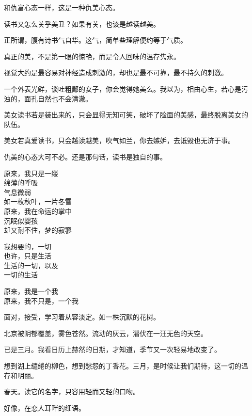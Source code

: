 		和仇富心态一样，这是一种仇美心态。\par
		读书又怎么关乎美丑？如果有关，也该是越读越美。\par
		正所谓，腹有诗书气自华。这气，简单些理解便约等于气质。\par
		真正的美，不是第一眼的惊艳，而是令人回味的温存隽永。\par
		视觉大约是最容易对神经造成刺激的，却也是最不可靠，最不持久的刺激。\par
		一个外表光鲜，谈吐粗鄙的女子，你会觉得她美么。我以为，相由心生，若心是污浊的，面孔自然也不会清澈。\par
		美女读书若是装出来的，只会显得无知可笑，破坏了脸面的美感，最终脱离美女的队伍。\par
		美女若真爱读书，只会越读越美，吹气如兰，你去嫉妒，去诋毁也无济于事。\par
		仇美的心态大可不必。还是那句话，读书是独自的事。

	\endwriting



		\longpoem{}{}{}
			原来，我只是一缕 \\
			绵薄的呼吸 \\
			气息微弱 \\
			如一枚秋叶，一片冬雪 \\
			原来，我在命运的掌中 \\
			沉眠似婴孩 \\
			却又耐不住，梦的寂寥

			我想要的，一切 \\
			也许，只是生活 \\
			生活的一切，以及 \\
			一切的生活

			原来，我是一个我 \\
			原来，我不只是，一个我
		\endlongpoem

	\endwriting



		面对，接受，学习着从容淡定。如一株沉默的花树。

		\vspace{1em}
		北京被阴郁覆盖，雾色苍然。流动的灰云，潜伏在一汪无色的天空。\par
		已是三月。我看日历上赫然的日期，才知道，季节又一次轻易地改变了。\par
		想到湖上缱绻的柳色，想到愁怨的丁香花。三月，是时候让我们期待，这一切的温存和明丽。\par
		春天。读它的名字，只容用轻而又轻的口吻。\par
		好像，在恋人耳畔的细语。

